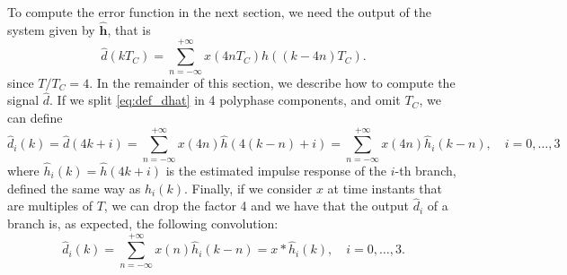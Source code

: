 \documentclass[10pt]{article}
\begin{document}
To compute the error function in the next section, we need the output of the system given by $\hat{\mathbf{h}}$, that is
\begin{equation}\label{eq:def_dhat}
	\hat{d}(kT_C) = \sum_{n=-\infty}^{+\infty} x(4nT_C)\hat{h}((k-4n)T_C).
\end{equation}
since $T/T_C=4$. In the remainder of this section, we describe how to compute the signal $\hat{d}$. If we split \eqref{eq:def_dhat} in 4 polyphase components, and omit $T_C$, we can define
\begin{equation}
	\hat{d}_i(k) = \hat{d}(4k+i) = \sum_{n=-\infty}^{+\infty} x(4n)\hat{h}(4(k-n)+i) = \sum_{n=-\infty}^{+\infty} x(4n)\hat{h}_i(k-n),\quad i=0,\ldots,3
\end{equation}
where $\hat{h}_i(k) = \hat{h}(4k+i)$ is the estimated impulse response of the $i$-th branch, defined the same way as $h_i(k)$. Finally, if we consider $x$ at time instants that are multiples of $T$, we can drop the factor 4 and we have that the output $\hat{d}_i$ of a branch is, as expected, the following convolution:
\begin{equation}
	\hat{d}_i(k) = \sum_{n=-\infty}^{+\infty} x(n)\hat{h}_i(k-n) = x \ast \hat{h}_i (k) ,\quad i=0,\ldots,3.
\end{equation}
\end{document}
